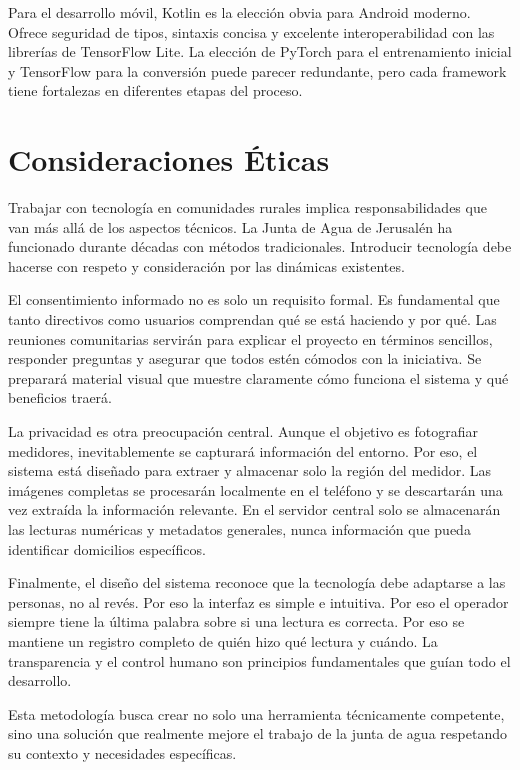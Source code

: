 Para el desarrollo móvil, Kotlin es la elección obvia para Android moderno. Ofrece seguridad de tipos, sintaxis concisa y excelente interoperabilidad con las librerías de TensorFlow Lite. La elección de PyTorch para el entrenamiento inicial y TensorFlow para la conversión puede parecer redundante, pero cada framework tiene fortalezas en diferentes etapas del proceso.

\section{Consideraciones Éticas}
\label{sec:ethical_considerations}

Trabajar con tecnología en comunidades rurales implica responsabilidades que van más allá de los aspectos técnicos. La Junta de Agua de Jerusalén ha funcionado durante décadas con métodos tradicionales. Introducir tecnología debe hacerse con respeto y consideración por las dinámicas existentes.

El consentimiento informado no es solo un requisito formal. Es fundamental que tanto directivos como usuarios comprendan qué se está haciendo y por qué. Las reuniones comunitarias servirán para explicar el proyecto en términos sencillos, responder preguntas y asegurar que todos estén cómodos con la iniciativa. Se preparará material visual que muestre claramente cómo funciona el sistema y qué beneficios traerá.

La privacidad es otra preocupación central. Aunque el objetivo es fotografiar medidores, inevitablemente se capturará información del entorno. Por eso, el sistema está diseñado para extraer y almacenar solo la región del medidor. Las imágenes completas se procesarán localmente en el teléfono y se descartarán una vez extraída la información relevante. En el servidor central solo se almacenarán las lecturas numéricas y metadatos generales, nunca información que pueda identificar domicilios específicos.

Finalmente, el diseño del sistema reconoce que la tecnología debe adaptarse a las personas, no al revés. Por eso la interfaz es simple e intuitiva. Por eso el operador siempre tiene la última palabra sobre si una lectura es correcta. Por eso se mantiene un registro completo de quién hizo qué lectura y cuándo. La transparencia y el control humano son principios fundamentales que guían todo el desarrollo.

Esta metodología busca crear no solo una herramienta técnicamente competente, sino una solución que realmente mejore el trabajo de la junta de agua respetando su contexto y necesidades específicas.